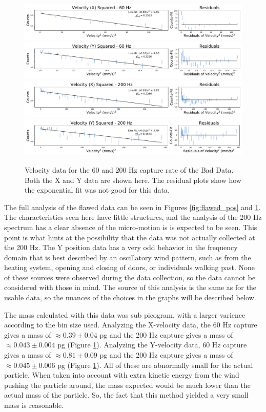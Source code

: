 \documentclass[12pt]{article}
\begin{document}
\begin{figure}[!ht]
\centering
    \includegraphics[width=\textwidth]{data_33_x_vel.pdf}
    \includegraphics[width=\textwidth]{data_33_y_vel.pdf}
    \includegraphics[width=\textwidth]{data_36_x_vel.pdf}
    \includegraphics[width=\textwidth]{data_36_y_vel.pdf}
	\caption{Velocity data for the 60 and 200 Hz capture rate of the Bad Data. Both the X and Y data are shown here. The residual plots show how the exponential fit was not good for this data.}
    \label{fig:flawed_vel}
\end{figure}

The full analysis of the flawed data can be seen in Figures \ref{fig:flawed_pos} and \ref{fig:flawed_vel}. The characteristics seen here have little structures, and the analysis of the 200 Hz spectrum has a clear absence of the micro-motion is is expected to be seen. This point is what hints at the possibility that the data was not actually collected at the 200 Hz. The Y position data has a very odd behavior in the frequency domain that is best described by an oscillatory wind pattern, such as from the heating system, opening and closing of doors, or individuals walking past. None of these sources were observed during the data collection, so the data cannot be considered with those in mind. The source of this analysis is the same as for the usable data, so the nuances of the choices in the graphs will be described below.

The mass calculated with this data was sub picogram, with a larger varience according to the bin size used. Analyzing the X-velocity data, the 60 Hz capture gives a mass of $\approx 0.39 \pm 0.04$ pg and the 200 Hz capture gives a mass of $\approx 0.043 \pm 0.004$ pg (Figure \ref{fig:flawed_vel}). Analyzing the Y-velocity data, 60 Hz capture gives a mass of $\approx 0.81 \pm 0.09$ pg and the 200 Hz capture gives a mass of $\approx 0.045 \pm 0.006$ pg (Figure \ref{fig:flawed_vel}). All of these are abnormally small for the actual particle. When taken into account with extra kinetic energy from the wind pushing the particle around, the mass expected would be much lower than the actual mass of the particle. So, the fact that this method yielded a very small mass is reasonable.
\end{document}
